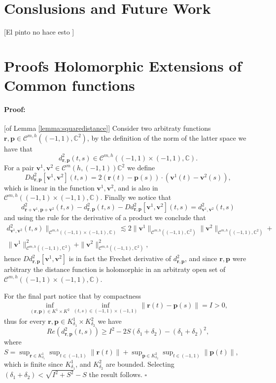 \documentclass{article}
\newenvironment{proof}{\paragraph{Proof:}}{\hfill$\square$}
\newcommand{\todo}[1]{{\color{red}[#1]}}
\newcommand{\IC}{{\mathbb C}}
\newcommand{\bp}{{\bm p}}
\newcommand{\cmspace}[3]{\mathcal{C}^{#1} \left( #2, #3 \right)}
\newcommand{\cmspaceh}[4]{\mathcal{C}^{#1,#2} \left( #3, #4 \right)}
\newcommand{\bv}{\bm{v}}
\newcommand{\br}{\bm{r}}
\newcommand{\iinterv}{(-1,1)\times(-1,1)}
\begin{document}
\section{Conslusions and Future Work}
\todo{El pinto no hace esto }




\appendix
\section{Proofs Holomorphic Extensions of Common functions }
\label{appendix:funext}

\begin{proof}[of Lemma \ref{lemma:squaredistance}]
Consider two arbitraty functions $\br,\bp \in \cmspaceh{m}{h}{(-1,1)}{\IC^2}$,  by the definition of the norm of the latter space we have that $$d_{\br,\bp}^2(t,s) \in \cmspaceh{m}{h}{\iinterv}{\IC}.$$
For a pair $\bv^1,\bv^2 \in \cmspace{m}{h}{(-1,1)}{\IC^2}$ we define
$$Dd_{\br,\bp}^2[\bv^1,\bv^2](t,s) = 2(\br(t)-\bp(s))\cdot (\bv^1(t)-\bv^2(s)),$$
which is linear in the function $\bv^1,\bv^2$, and is also in $\cmspaceh{m}{h}{\iinterv}{\IC}$. Finally we notice that 
$$
d^2_{\br+\bv^1,\bp+\bv^2}(t,s) -d^2_{\br,\bp}(t,s) -Dd_{\br,\bp}^2[\bv^1,\bv^2](t,s) = d^2_{\bv^1,\bv^2}(t,s)
$$
and using the rule for the derivative of a product we conclude that 
\begin{align*}
d^2_{\bv^1,\bv^2}(t,s)\|_{\cmspaceh{m}{h}{\iinterv}{\IC}} \lesssim 2\|\bv^1\|_{\cmspaceh{m}{h}{(-1,1)}{\IC^2}} \|\bv^2\|_{\cmspaceh{m}{h}{(-1,1)}{\IC^2}}+  \\ \|\bv^1\|_{\cmspaceh{m}{h}{(-1,1)}{\IC^2}}^2+\|\bv^2\|_{\cmspaceh{m}{h}{(-1,1)}{\IC^2}}^2 ,
\end{align*} 
hence $Dd_{\br,\bp}^2[\bv^1,\bv^2]$ is in fact the Frechet derivative of $d_{\br,\bp}^2$, and since $\br,\bp$ were arbitrary the distance function is holomorphic in an arbitraty open set of 
$\cmspaceh{m}{h}{\iinterv}{\IC}$.

For the final part notice that by compactness 
\begin{align*}
\inf_{(\br,\bp) \in K^1 \times K^2} \inf_{(t,s) \in (-1,1)\times(-1,1)}
 \| \br(t) - \bp(s) \| = I > 0,
\end{align*}
thus for every $\br,\bp  \in K^1_{\delta_1} \times K^2_{\delta_2}$ we have
$$
Re(d_{\br,\bp}^2(t,s)) \geq I^2 -2 S(\delta_1 + \delta_2) - ( \delta_1 + \delta_2)^2,$$
where $S = \sup_{\br \in K^1_{\delta_1}} \sup_{t \in (-1,1)} \| \br(t)\| +
\sup_{\bp \in K^2_{\delta_2}} \sup_{t \in (-1,1)} \| \bp(t)\|$, which is finite since $K^1_{\delta_1}$, and $K^2_{\delta_2}$ are bounded. Selecting $(\delta_1+\delta_2) < \sqrt{I^2+S^2}-S$ the result follows.
\end{proof}
\end{document}
